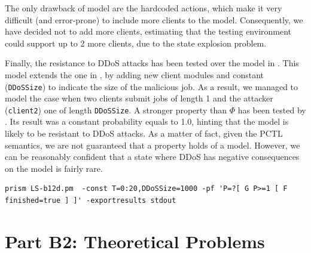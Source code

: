 \documentclass{report}
\begin{document}
The only drawback of model  are the hardcoded actions, which make it very difficult (and error-prone) to include more clients to the model. Consequently, we have decided not to add more clients, estimating that the testing environment could support up to 2 more clients, due to the state explosion problem.

Finally, the resistance to DDoS attacks has been tested over the model in . This model extends the one in , by adding new client modules and constant (\texttt{DDoSSize}) to indicate the size of the malicious job. As a result, we managed to model the case when two clients submit jobs of length 1 and the attacker (\texttt{client2}) one of length \texttt{DDoSSize}. A stronger property than $\Phi$ has been tested by . Its result was a constant probability equals to 1.0, hinting that the model is likely to be resistant to DDoS attacks. As a matter of fact, given the PCTL semantics, we are not guaranteed that a property holds of a model. However, we can be reasonably confident that a state where DDoS has negative consequences on the model is fairly rare.

\begin{lstlisting}[caption=Command to compute probabilities in \Cref{fig:b11c},label={log:b12d}]
prism LS-b12d.pm  -const T=0:20,DDoSSize=1000 -pf 'P=?[ G P>=1 [ F finished=true ] ]' -exportresults stdout
\end{lstlisting}

\chapter{Part B2: Theoretical Problems}
\end{document}
